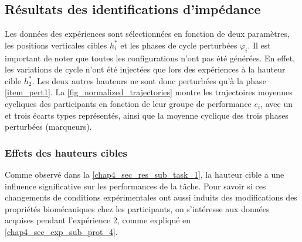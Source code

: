 %

\subsection{Résultats des identifications d'impédance} \label{chap4_sec_res_sub_impedance}

Les données des expériences sont sélectionnées en fonction de deux paramètres, les positions verticales cibles $h^*_i$ et les phases de cycle perturbées $\varphi_i$. Il est important de noter que toutes les configurations n'ont pas été générées. En effet, les variations de cycle n'ont été injectées que lors des expériences à la hauteur cible $h_2^*$. Les deux autres hauteurs ne sont donc %
perturbées qu'à la phase \cref{item_pert1}. La \cref{fig_normalized_trajectories} montre les trajectoires moyennes cycliques des participants en fonction de leur groupe de performance $e_i$, avec un et trois écarts types représentés, ainsi que la moyenne cyclique des trois phases perturbées (marqueurs).





\subsubsection{Effets des hauteurs cibles} \label{chap4_sec_res_sub_impedance_1}

Comme observé dans la \cref{chap4_sec_res_sub_task_1}, la hauteur cible a une influence significative sur les performances de la tâche. %
Pour savoir si ces changements de conditions expérimentales ont aussi induits des modifications des propriétés biomécaniques chez les participants, on s'intéresse aux données acquises pendant l'expérience 2, comme expliqué en \cref{chap4_sec_exp_sub_prot_4}.

